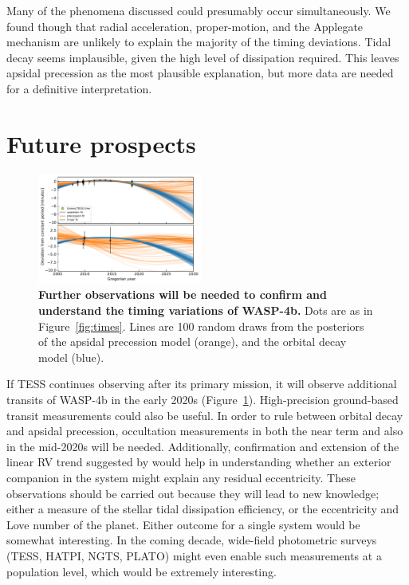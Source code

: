 \documentclass[12pt,twocolumn,tighten]{aastex62}
\begin{document}
Many of the phenomena discussed could presumably occur simultaneously.
We found though that radial acceleration, proper-motion, and the
Applegate mechanism are unlikely to explain the majority of the timing
deviations.  Tidal decay seems implausible, given the high level of
dissipation required.  This leaves apsidal precession as the most
plausible explanation, but more data are needed for a definitive
interpretation.


\section{Future prospects}
\label{sec:future}

\begin{figure}[!t]
	\begin{center}
		\leavevmode
		\includegraphics[width=0.48\textwidth]{f5.pdf}
	\end{center}
  \vspace{-0.5cm}
	\caption{
		{\bf Further observations will be needed to
	    confirm and understand the timing variations of WASP-4b.}
		Dots are as in Figure~\ref{fig:times}.
		Lines are 100 random draws from the posteriors of the apsidal
		precession model (orange), and the orbital decay model (blue).    
		\label{fig:future}
	}
\end{figure}

If TESS continues observing after its primary mission, it will observe
additional transits of WASP-4b in the early 2020s
(Figure~\ref{fig:future}).  High-precision ground-based transit
measurements could also be useful.  In order to rule between orbital
decay and apsidal precession, occultation measurements in both the
near term and also in the mid-2020s will be needed.  Additionally,
confirmation and extension of the linear RV trend suggested by
\citet{knutson_friends_2014} would help in understanding whether an
exterior companion in the system might explain any residual
eccentricity.  These observations should be carried out because they
will lead to new knowledge; either a measure of the stellar tidal
dissipation efficiency, or the eccentricity and Love number of the
planet.  Either outcome for a single system would be somewhat
interesting.  In the coming decade, wide-field photometric surveys
(TESS, HATPI, NGTS, PLATO) might even enable such measurements at a
population level, which would be extremely interesting.
\end{document}
